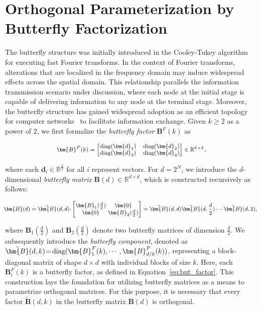 \section{Orthogonal Parameterization by Butterfly Factorization}

The butterfly structure was initially introduced in the Cooley-Tukey algorithm for executing fast Fourier transforms. In the context of Fourier transforms, alterations that are localized in the frequency domain may induce widespread effects across the spatial domain. This relationship parallels the information transmission scenario under discussion, where each node at the initial stage is capable of delivering information to any node at the terminal stage. Moreover, the butterfly structure has gained widespread adoption as an efficient topology for computer networks~\cite{solihin2015fundamentals,li2011linear} to facilitate information exchange. Given $k\geq 2$ as a power of $2$, we first formalize the \emph{butterfly factor} $\bm{B}^F(k)$ as

\begin{equation}\label{eq:but_factor}
\footnotesize
\begin{aligned}
    \bm{B}^F(k)=\begin{bmatrix}
    \text{diag}(\bm{d}_1) & \text{diag}(\bm{d}_2) \\
    \text{diag}(\bm{d}_3) & \text{diag}(\bm{d}_4)
    \end{bmatrix}\in\mathbb{R}^{k\times k},
\end{aligned}
\end{equation}

where each $\bm{d}_i\in\mathbb{R}^{\frac{k}{2}}$ for all $i$ represent vectors. For $d=2^N$, we introduce the $d$-dimensional \emph{butterfly matrix} $\bm{B}(d)\in\mathbb{R}^{d\times d}$, which is constructed recursively as follows:

\begin{equation}
\footnotesize
\begin{aligned}
    \!\!\bm{B}(d)=\tilde{\bm{B}}(d,d)\!\cdot\!\begin{bmatrix}
    \bm{B}_1(\frac{d}{2})\!\!\!\!\! & \bm{0} \\
    \bm{0}\!\!\!\!\! &\bm{B}_2(\frac{d}{2})
    \end{bmatrix}= \tilde{\bm{B}}(d,d)\tilde{\bm{B}}(d,\frac{d}{2})\cdots\tilde{\bm{B}}(d,2),
\end{aligned}
\end{equation}

where $\bm{B}_1(\frac{d}{2})$ and $\bm{B}_2(\frac{d}{2})$ denote two butterfly matrices of dimension $\frac{d}{2}$. We subsequently introduce the \emph{butterfly component}, denoted as $\thickmuskip=2mu \medmuskip=2mu \tilde{\bm{B}}(d,k)=\text{diag}(\bm{B}^F_1(k),\cdots,\bm{B}^F_{d/k}(k))$, representing a block-diagonal matrix of shape $d\times d$ with individual blocks of size $k$. Here, each $\bm{B}^F_i(k)$ is a butterfly factor, as defined in Equation~\ref{eq:but_factor}. This construction lays the foundation for utilizing butterfly matrices as a means to parametrize orthogonal matrices. For this purpose, it is necessary that every factor $\tilde{\bm{B}}(d,k)$ in the butterfly matrix $\bm{B}(d)$ is orthogonal. 

